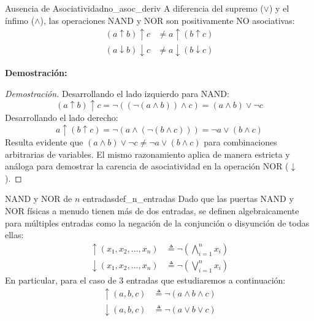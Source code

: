 \documentclass[12pt,a4paper]{article}
\newcommand{\desplegable}[2]{%
  \par\vspace{1ex}\noindent
  \textbf{Demostración:}
  \vspace{1ex}
  
  #2
  \par\vspace{1ex}
}
\begin{document}
\begin{teorema}{Ausencia de Asociatividad}{no_asoc_deriv}
A diferencia del supremo ($\vee$) y el ínfimo ($\wedge$), las operaciones NAND y NOR son positivamente NO asociativas:
\begin{align*}
    (a \uparrow b) \uparrow c &\neq a \uparrow (b \uparrow c) \\
    (a \downarrow b) \downarrow c &\neq a \downarrow (b \downarrow c)
\end{align*}
\end{teorema}
\desplegable{proof_no_asoc_deriv}{
\begin{proof}[Demostración]
Desarrollando el lado izquierdo para NAND:
\[ (a \uparrow b) \uparrow c = \neg ( (\neg (a \wedge b)) \wedge c ) = (a \wedge b) \vee \neg c \]
Desarrollando el lado derecho:
\[ a \uparrow (b \uparrow c) = \neg ( a \wedge (\neg (b \wedge c)) ) = \neg a \vee (b \wedge c) \]
Resulta evidente que $(a \wedge b) \vee \neg c \neq \neg a \vee (b \wedge c)$ para combinaciones arbitrarias de variables. El mismo razonamiento aplica de manera estricta y análoga para demostrar la carencia de asociatividad en la operación NOR ($\downarrow$).
\end{proof}
}

\begin{definicion}{NAND y NOR de $n$ entradas}{def_n_entradas}
Dado que las puertas NAND y NOR físicas a menudo tienen más de dos entradas, se definen algebraicamente para múltiples entradas como la negación de la conjunción o disyunción de todas ellas:
\begin{align*}
    \uparrow(x_1, x_2, \dots, x_n) &\triangleq \neg \left( \bigwedge_{i=1}^n x_i \right) \\
    \downarrow(x_1, x_2, \dots, x_n) &\triangleq \neg \left( \bigvee_{i=1}^n x_i \right)
\end{align*}
En particular, para el caso de 3 entradas que estudiaremos a continuación:
\begin{align*}
    \uparrow(a,b,c) &\triangleq \neg(a \wedge b \wedge c) \\
    \downarrow(a,b,c) &\triangleq \neg(a \vee b \vee c)
\end{align*}
\end{definicion}
\end{document}
